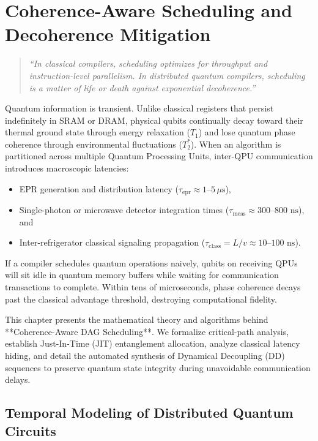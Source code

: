 \chapter{Coherence-Aware Scheduling and Decoherence Mitigation}
\label{ch:scheduling_decoherence}

\begin{quote}
\textit{``In classical compilers, scheduling optimizes for throughput and instruction-level parallelism. In distributed quantum compilers, scheduling is a matter of life or death against exponential decoherence.''}
\end{quote}

Quantum information is transient. Unlike classical registers that persist indefinitely in SRAM or DRAM, physical qubits continually decay toward their thermal ground state through energy relaxation ($T_1$) and lose quantum phase coherence through environmental fluctuations ($T_2^*$). When an algorithm is partitioned across multiple Quantum Processing Units, inter-QPU communication introduces macroscopic latencies:
\begin{itemize}
    \item EPR generation and distribution latency ($\tau_{\text{epr}} \approx 1\text{--}5\,\mu\text{s}$),
    \item Single-photon or microwave detector integration times ($\tau_{\text{meas}} \approx 300\text{--}800\text{ ns}$), and
    \item Inter-refrigerator classical signaling propagation ($\tau_{\text{class}} = L/v \approx 10\text{--}100\text{ ns}$).
\end{itemize}

If a compiler schedules quantum operations naively, qubits on receiving QPUs will sit idle in quantum memory buffers while waiting for communication transactions to complete. Within tens of microseconds, phase coherence decays past the classical advantage threshold, destroying computational fidelity.

This chapter presents the mathematical theory and algorithms behind **Coherence-Aware DAG Scheduling**. We formalize critical-path analysis, establish Just-In-Time (JIT) entanglement allocation, analyze classical latency hiding, and detail the automated synthesis of Dynamical Decoupling (DD) sequences to preserve quantum state integrity during unavoidable communication delays.

\section{Temporal Modeling of Distributed Quantum Circuits}
\label{sec:temporal_modeling}

